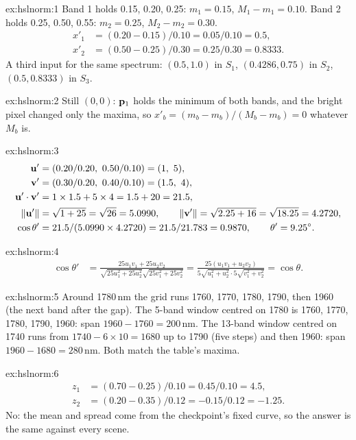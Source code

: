 
\begin{solution}{ex:hslnorm:1}
Band 1 holds 0.15, 0.20, 0.25: $m_1=0.15$, $M_1-m_1=0.10$. Band 2 holds 0.25, 0.50, 0.55: $m_2=0.25$, $M_2-m_2=0.30$.
\begin{align*}
x'_1 &= (0.20-0.15)/0.10 = 0.05/0.10 = 0.5,\\
x'_2 &= (0.50-0.25)/0.30 = 0.25/0.30 = 0.8333 .
\end{align*}
A third input for the same spectrum: $(0.5,1.0)$ in $S_1$, $(0.4286,0.75)$ in $S_2$, $(0.5,0.8333)$ in $S_3$.
\end{solution}

\begin{solution}{ex:hslnorm:2}
Still $(0,0)$: $\mathbf{p}_1$ holds the minimum of both bands, and the bright pixel changed only the maxima, so
$x'_b=(m_b-m_b)/(M_b-m_b)=0$ whatever $M_b$ is.
\end{solution}

\begin{solution}{ex:hslnorm:3}
\begin{align*}
\mathbf{u}' &= (0.20/0.20,\ 0.50/0.10)=(1,\ 5),\\
\mathbf{v}' &= (0.30/0.20,\ 0.40/0.10)=(1.5,\ 4),\\
\mathbf{u}'\cdot\mathbf{v}' &= 1\times1.5+5\times4 = 1.5+20 = 21.5,\\
\left\lVert \mathbf{u}' \right\rVert &= \sqrt{1+25} = \sqrt{26} = 5.0990, \qquad \left\lVert \mathbf{v}' \right\rVert = \sqrt{2.25+16} = \sqrt{18.25} = 4.2720,\\
\cos\theta' &= 21.5/(5.0990\times4.2720) = 21.5/21.783 = 0.9870, \qquad \theta' = 9.25^\circ .
\end{align*}
\end{solution}

\begin{solution}{ex:hslnorm:4}
\begin{align*}
\cos\theta' &= \frac{25u_1v_1+25u_2v_2}{\sqrt{25u_1^2+25u_2^2}\sqrt{25v_1^2+25v_2^2}}
 = \frac{25(u_1v_1+u_2v_2)}{5\sqrt{u_1^2+u_2^2}\cdot5\sqrt{v_1^2+v_2^2}} = \cos\theta .
\end{align*}
\end{solution}

\begin{solution}{ex:hslnorm:5}
Around 1780\,nm the grid runs 1760, 1770, 1780, 1790, then 1960 (the next band after the gap). The 5-band window centred
on 1780 is 1760, 1770, 1780, 1790, 1960: span $1960-1760=200$\,nm. The 13-band window centred on 1740 runs from
$1740-6\times10=1680$ up to 1790 (five steps) and then 1960: span $1960-1680=280$\,nm. Both match the table's maxima.
\end{solution}

\begin{solution}{ex:hslnorm:6}
\begin{align*}
z_1 &= (0.70-0.25)/0.10 = 0.45/0.10 = 4.5,\\
z_2 &= (0.20-0.35)/0.12 = -0.15/0.12 = -1.25 .
\end{align*}
No: the mean and spread come from the checkpoint's fixed curve, so the answer is the same against every scene.
\end{solution}
